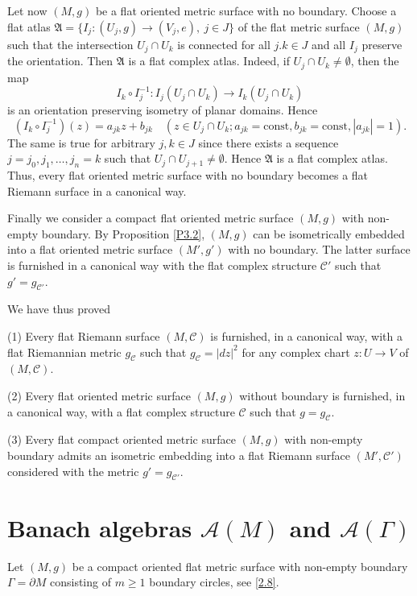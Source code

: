 \documentclass[12pt,reqno]{amsart}
\begin{document}
Let now $(M,g)$ be a flat oriented metric surface with no boundary. Choose a flat atlas
$\mathfrak{A}=\{ I_j:(U_j,g)\to (V_j,e),\ j\in J\}$ of the flat metric surface $(M,g)$ such that the intersection $U_j\cap U_k$ is connected for all $j.k\in J$ and all $I_j$ preserve the orientation. Then $\mathfrak{A}$ is a flat complex atlas. Indeed, if $U_j\cap U_k\neq\emptyset$, then the map
$$
I_k\circ I_j^{-1}:I_j(U_j\cap U_k)\to I_k(U_j\cap U_k)
$$
is an orientation preserving isometry of planar domains. Hence
$$
(I_k\circ I_j^{-1})(z)=a_{jk}z+b_{jk}\quad (z\in U_j\cap U_k;a_{jk}=\mbox{const},b_{jk}=\mbox{const},|a_{jk}|=1).
$$
The same is true for arbitrary $j,k\in J$ since there exists a sequence $j=j_0,j_1,\dots,j_n=k$ such that $U_j\cap U_{j+1}\neq\emptyset$.
Hence $\mathfrak{A}$ is a flat complex atlas.
Thus, every flat oriented metric surface with no boundary becomes a flat Riemann surface in a canonical way.

Finally we consider a compact flat oriented metric surface $(M,g)$ with non-empty boundary. By Proposition \ref{P3.2}, $(M,g)$ can be isometrically embedded into a flat oriented metric surface $(M',g')$ with no boundary. The latter surface is furnished in a canonical way with the flat complex structure ${\mathcal C}'$ such that $g'=g_{{\mathcal C}'}$.

We have thus proved

\begin{proposition} \label{P5.6}
{\rm (1)} Every flat Riemann surface $(M,{\mathcal C})$ is furnished, in a canonical way, with a flat Riemannian metric $g_{\mathcal C}$ such that $g_{\mathcal C}=|dz|^2$ for any complex chart $z:U\to V$ of $(M,{\mathcal C})$.

{\rm (2)} Every flat oriented metric surface $(M,g)$ without boundary is furnished, in a canonical way, with a flat complex structure ${\mathcal C}$ such that $g=g_{\mathcal C}$.

{\rm (3)} Every flat compact oriented metric surface $(M,g)$ with non-empty boundary admits an isometric embedding into a flat Riemann surface $(M',{\mathcal C}')$ considered with the metric $g'=g_{{\mathcal C}'}$.
\end{proposition}

\section{Banach algebras ${\mathcal A}(M)$ and ${\mathcal A}(\Gamma)$}

Let $(M,g)$ be a compact oriented flat metric surface with non-empty boundary $\Gamma=\partial M$ consisting of $m\ge1$ boundary circles, see \eqref{2.8}.
\end{document}
